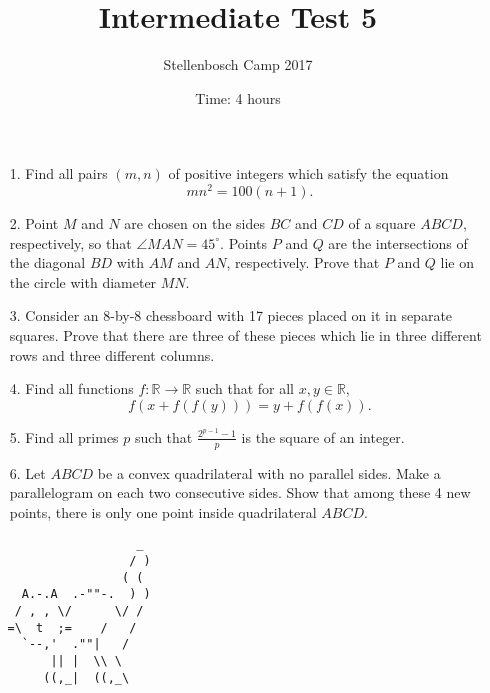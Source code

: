 \documentclass[12pt]{article}
\title{Intermediate Test 5}
\author{Stellenbosch Camp 2017}
\date{Time: 4 hours}
\begin{document}
 \maketitle

\begin{enumerate}

\item[1.] %
Find all pairs $(m,n)$ of positive integers which satisfy the equation
  \[ mn^2 = 100(n+1). \]


\item[2.] %
Point $M$ and $N$ are chosen on the sides $BC$ and $CD$ of a square $ABCD$, respectively, so that $\angle MAN = 45^\circ$. Points $P$ and $Q$ are the intersections of the diagonal $BD$ with $AM$ and $AN$, respectively. Prove that $P$ and $Q$ lie on the circle with diameter $MN$.


\item[3.] %
Consider an 8-by-8 chessboard with 17 pieces placed on it in separate squares. Prove that there are three of these pieces which lie in three different rows and three different columns.


\item[4.] %
Find all functions $f: \mathbb{R} \to \mathbb{R}$ such that for all $x,y \in \mathbb{R}$,
  \[ f(x+f(f(y))) = y+f(f(x)). \]


\item[5.] %
Find all primes $p$ such that $\displaystyle \frac{2^{p-1}-1}{p}$ is the square of an integer.
 

\item[6.] %
Let $ABCD$ be a convex quadrilateral with no parallel sides. Make a parallelogram on each two consecutive sides. Show that among these 4 new points, there is only one point inside quadrilateral $ABCD$.


\end{enumerate}

\vspace{12mm}

\centering
\begin{BVerbatim}
                     _
                    / )
                   ( (
     A.-.A  .-""-.  ) )
    / , , \/      \/ /
   =\  t  ;=    /   /
     `--,'  .""|   /
         || |  \\ \
        ((,_|  ((,_\
\end{BVerbatim}
\end{document}
